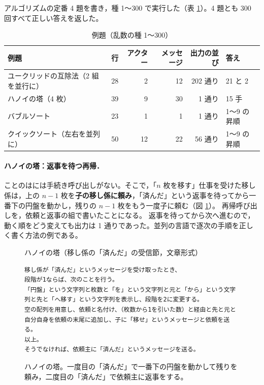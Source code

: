 \documentclass[a4paper,10pt]{ltjsarticle}
\begin{document}
アルゴリズムの定番 4 題を書き，種 1〜300 で実行した（表 \ref{tab:ex}）。4 題とも 300 回すべて正しい答えを返した。

\begin{table}[t]
\centering\small
\caption{例題（乱数の種 1〜300）}\label{tab:ex}
\begin{tabular}{@{}lrrrrl@{}}
\toprule
例題 & 行 & アクター & メッセージ & 出力の並び & 答え \\
\midrule
ユークリッドの互除法（2 組を並行に） & 28 & 2 & 12 & 202 通り & 21 と 2 \\
ハノイの塔（4 枚） & 39 & 9 & 30 & 1 通り & 15 手 \\
バブルソート & 23 & 1 & 1 & 1 通り & 1〜9 の昇順 \\
クイックソート（左右を並列に） & 50 & 12 & 22 & 56 通り & 1〜9 の昇順 \\
\bottomrule
\end{tabular}
\end{table}

\paragraph{ハノイの塔：返事を待つ再帰．}
ことのはには手続き呼び出しがない。そこで，「$n$ 枚を移す」仕事を受けた移し係は，上の $n-1$ 枚を\textbf{子の移し係に頼み}，「済んだ」という返事を待ってから一番下の円盤を動かし，残りの $n-1$ 枚をもう一度子に頼む（図 \ref{fig:hanoi}）。
再帰呼び出しを，依頼と返事の組で書いたことになる。
返事を待ってから次へ進むので，動く順をどう変えても出力は 1 通りであった。並列の言語で逐次の手順を正しく書く方法の例である。

\begin{figure}[t]
\begin{prog}{ハノイの塔（移し係の「済んだ」の受信節，文章形式）}
\begin{Verbatim}
移し係が「済んだ」というメッセージを受け取ったとき、
段階が1ならば、次のことを行う。
「円盤」という文字列と枚数と「を」という文字列と元と「から」という文字列と先と「へ移す」という文字列を表示し、段階を2に変更する。
空の配列を用意し、依頼と名付け、（枚数から1を引いた数）と経由と先と元と自分自身を依頼の末尾に追加し、子に「移せ」というメッセージと依頼を送る。
以上。
そうでなければ、依頼主に「済んだ」というメッセージを送る。
\end{Verbatim}
\end{prog}
\caption{ハノイの塔。一度目の「済んだ」で一番下の円盤を動かして残りを頼み，二度目の「済んだ」で依頼主に返事をする。}\label{fig:hanoi}
\end{figure}
\end{document}
